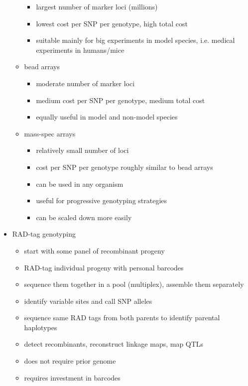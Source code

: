 \documentclass{article}
\begin{document}
\begin{itemize}
\begin{itemize}
\begin{itemize}
                \item largest number of marker loci (millions)
                \item lowest cost per SNP per genotype, high total cost
                \item suitable mainly for big experiments in model species, i.e. medical experiments in humans/mice
            \end{itemize}
            \item bead arrays
            \begin{itemize}
                \item moderate number of marker loci
                \item medium cost per SNP per genotype, medium total cost
                \item equally useful in model and non-model species
            \end{itemize}
            \item mass-spec arrays
            \begin{itemize}
                \item relatively small number of loci
                \item cost per SNP per genotype roughly similar to bead arrays
                \item can be used in any organism
                \item useful for progressive genotyping strategies
                \item can be scaled down more easily
            \end{itemize}
        \end{itemize}
        \item RAD-tag genotyping
        \begin{itemize}
            \item start with some panel of recombinant progeny
            \item RAD-tag individual progeny with personal barcodes
            \item sequence them together in a pool (multiplex), assemble them separately
            \item identify variable sites and call SNP alleles
            \item sequence same RAD tags from both parents to identify parental haplotypes
            \item detect recombinants, reconstruct linkage maps, map QTLs
            \item does not require prior genome
            \item requires investment in barcodes
        \end{itemize}
    \end{itemize}
\end{document}

